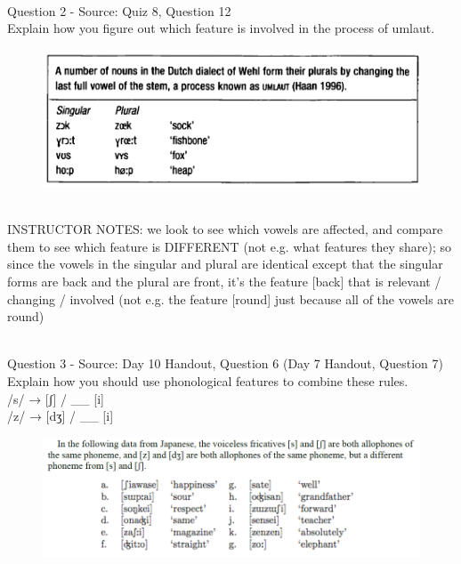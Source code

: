 \documentclass[12pt]{article}
\begin{document}
~\\

{\large Question 2} - Source: Quiz 8, Question 12\\

Explain how you figure out which feature is involved in the process of umlaut.\\

\begin{figure}[H]
\includegraphics{../images/dutch.png}
\end{figure}

~\\
INSTRUCTOR NOTES: we look to see which vowels are affected, and compare them to see which feature is DIFFERENT (not e.g. what features they share); so since the vowels in the singular and plural are identical except that the singular forms are back and the plural are front, it's the feature [back] that is relevant / changing / involved (not e.g. the feature [round] just because all of the vowels are round)


~\\

{\large Question 3} - Source: Day 10 Handout, Question 6 (Day 7 Handout, Question 7)\\

Explain how you should use phonological features to combine these rules.\\

/s/ → {[ʃ]} / \_\_ {[i]} \\/z/ → {[dʒ]} / \_\_ {[i]}

\begin{figure}[H]
\includegraphics{../images/japanese.png}
\end{figure}
\end{document}

